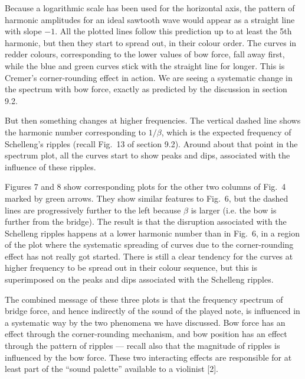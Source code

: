   Because a logarithmic scale has been used for the horizontal axis, the 
  pattern of harmonic amplitudes for an ideal sawtooth wave would appear as a 
  straight line with slope $-1$. All the plotted lines follow this prediction 
  up to at least the 5th harmonic, but then they start to spread out, in their 
  colour order. The curves in redder colours, corresponding to the lower values 
  of bow force, fall away first, while the blue and green curves stick with the 
  straight line for longer. This is Cremer’s corner-rounding effect in action. 
  We are seeing a systematic change in the spectrum with bow force, exactly as 
  predicted by the discussion in section 9.2. 

  But then something changes at higher frequencies. The vertical dashed line 
  shows the harmonic number corresponding to $1/\beta$, which is the expected 
  frequency of Schelleng’s ripples (recall Fig.\ 13 of section 9.2). Around 
  about that point in the spectrum plot, all the curves start to show peaks and 
  dips, associated with the influence of these ripples. 

  Figures 7 and 8 show corresponding plots for the other two columns of Fig.\ 4 
  marked by green arrows. They show similar features to Fig.\ 6, but the dashed 
  lines are progressively further to the left because $\beta$ is larger (i.e. 
  the bow is further from the bridge). The result is that the disruption 
  associated with the Schelleng ripples happens at a lower harmonic number than 
  in Fig.\ 6, in a region of the plot where the systematic spreading of curves 
  due to the corner-rounding effect has not really got started. There is still 
  a clear tendency for the curves at higher frequency to be spread out in their 
  colour sequence, but this is superimposed on the peaks and dips associated 
  with the Schelleng ripples. 

  The combined message of these three plots is that the frequency spectrum of 
  bridge force, and hence indirectly of the sound of the played note, is 
  influenced in a systematic way by the two phenomena we have discussed. Bow 
  force has an effect through the corner-rounding mechanism, and bow position 
  has an effect through the pattern of ripples — recall also that the magnitude 
  of ripples is influenced by the bow force. These two interacting effects are 
  responsible for at least part of the “sound palette” available to a violinist 
  [2]. 

